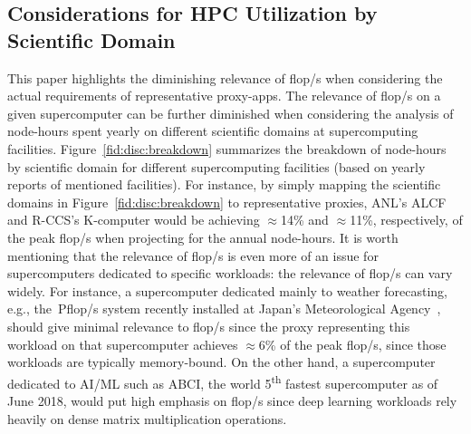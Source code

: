 \subsection{Considerations for HPC Utilization by Scientific Domain}\label{ssec:workload_util}
%
\begin{comment}
\begin{figure}[tbp]
    \centering
    \texttt{[image: sys-util]}
    \caption{\label{fid:disc:breakdown} Annual HPC site/system utilization by domain; Labels acc. to Table~\ref{table:APP}: \texttt{geo} = Geo-/Earthscience, \texttt{chm} = Chemistry, \texttt{phy} = Physics, \texttt{qcd} = Lattice QCD, \texttt{mat} = Material Science/Engineering, \texttt{eng} = Engineering (Mechanics, CFD), \texttt{mcs} = Math/Computer Science, \texttt{bio} = Bioscience, \texttt{oth} = \textit{Other}}
\end{figure}
\end{comment}
%
This paper highlights the diminishing relevance of \unit[]{flop/s} when
considering the actual requirements of representative proxy-apps.
The relevance of \unit[]{flop/s} on a given supercomputer can be further
diminished when considering the analysis of node-hours spent yearly on
different scientific domains at supercomputing facilities.
Figure~\ref{fid:disc:breakdown} summarizes the breakdown of node-hours by
scientific domain for different supercomputing facilities (based on yearly
reports of mentioned facilities). For instance, by simply mapping the scientific
domains in Figure~\ref{fid:disc:breakdown} to representative proxies,
ANL's ALCF and \mbox{R-CCS's} K-computer would be achieving $\approx$14\% and
$\approx$11\%, respectively, of the peak \unit[]{flop/s} when projecting
for the annual node-hours. %
It is worth mentioning that the relevance of \unit[]{flop/s} is even more
of an issue for supercomputers dedicated to specific workloads: the relevance of
\unit[]{flop/s} can vary widely. For instance, a supercomputer dedicated
mainly to weather forecasting, e.g., the~\unit[18]{Pflop/s} system recently
installed at Japan's Meteorological Agency~\cite{japan_meteorological_agency_jma_jma_2018},
should give minimal relevance to \unit[]{flop/s} since the proxy representing
this workload on that supercomputer achieves $\approx$6\% of the peak \unit[]{flop/s},
since those workloads are typically memory-bound. On the other hand, a
supercomputer dedicated to AI/ML such as ABCI, the world 5\textsuperscript{th}
fastest supercomputer as of June 2018, would put high emphasis on \unit[]{flop/s}
since deep learning workloads rely heavily on dense matrix multiplication operations.


